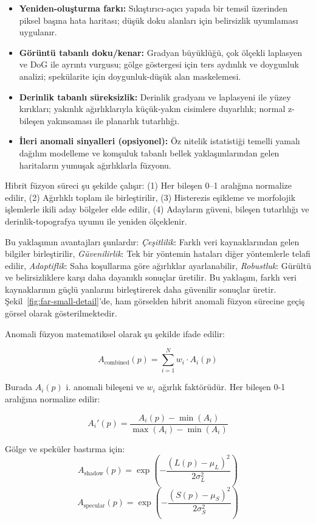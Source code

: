 \documentclass[12pt]{article}
\begin{document}
\begin{itemize}
  \item \textbf{Yeniden-oluşturma farkı:} Sıkıştırıcı-açıcı yapıda bir temsil üzerinden piksel başına hata haritası; düşük doku alanları için belirsizlik uyumlaması uygulanır.
  \item \textbf{Görüntü tabanlı doku/kenar:} Gradyan büyüklüğü, çok ölçekli laplasyen ve DoG ile ayrıntı vurgusu; gölge göstergesi için ters aydınlık ve doygunluk analizi; spekülarite için doygunluk-düşük alan maskelemesi.
  \item \textbf{Derinlik tabanlı süreksizlik:} Derinlik gradyanı ve laplasyeni ile yüzey kırıkları; yakınlık ağırlıklarıyla küçük-yakın cisimlere duyarlılık; normal z-bileşen yakınsaması ile planarlık tutarlılığı.
  \item \textbf{İleri anomali sinyalleri (opsiyonel):} Öz nitelik istatistiği temelli yamalı dağılım modelleme ve komşuluk tabanlı bellek yaklaşımlarından gelen haritaların yumuşak ağırlıklarla füzyonu.
\end{itemize}

Hibrit füzyon süreci şu şekilde çalışır: (1) Her bileşen 0–1 aralığına normalize edilir, (2) Ağırlıklı toplam ile birleştirilir, (3) Histerezis eşikleme ve morfolojik işlemlerle ikili aday bölgeler elde edilir, (4) Adayların güveni, bileşen tutarlılığı ve derinlik-topografya uyumu ile yeniden ölçeklenir. 

Bu yaklaşımın avantajları şunlardır: \emph{Çeşitlilik}: Farklı veri kaynaklarından gelen bilgiler birleştirilir, \emph{Güvenilirlik}: Tek bir yöntemin hataları diğer yöntemlerle telafi edilir, \emph{Adaptiflik}: Saha koşullarına göre ağırlıklar ayarlanabilir, \emph{Robustluk}: Gürültü ve belirsizliklere karşı daha dayanıklı sonuçlar üretilir. Bu yaklaşım, farklı veri kaynaklarının güçlü yanlarını birleştirerek daha güvenilir sonuçlar üretir. Şekil~\ref{fig:far-small-detail}'de, ham görselden hibrit anomali füzyon sürecine geçiş görsel olarak gösterilmektedir.

Anomali füzyon matematiksel olarak şu şekilde ifade edilir:

\[ A_{\text{combined}}(p) = \sum_{i=1}^{N} w_i \cdot A_i(p) \]

Burada \(A_i(p)\) i. anomali bileşeni ve \(w_i\) ağırlık faktörüdür. Her bileşen 0-1 aralığına normalize edilir:

\[ A_i'(p) = \frac{A_i(p) - \min(A_i)}{\max(A_i) - \min(A_i)} \]

Gölge ve speküler bastırma için:
\[ A_{\text{shadow}}(p) = \exp\left(-\frac{(L(p) - \mu_L)^2}{2\sigma_L^2}\right) \]
\[ A_{\text{specular}}(p) = \exp\left(-\frac{(S(p) - \mu_S)^2}{2\sigma_S^2}\right) \]
\end{document}
